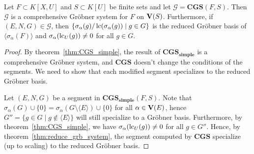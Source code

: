 \begin{theorem}\label{thm:CGS}
  Let $F \subset K[X, U]$ and $S \subset K[U]$ be finite sets and let $\mathcal G = \mathbf{CGS}(F, S)$. Then $\mathcal G$ is a comprehensive Gröbner system for $F$ on $\operatorname{\mathbf V}(S)$. Furthermore, if $(E, N, G) \in \mathcal G$, then $\{\sigma_{\alpha}(g)/\operatorname{lc}(\sigma_{\alpha}(g)) \mid g \in G\}$ is the reduced Gröbner basis of $\langle \sigma_{\alpha}(F) \rangle$ and $\sigma_{\alpha}(\operatorname{lc}_{U}(g)) \neq 0$ for all $g \in G$.
\end{theorem}
\begin{proof}
  By theorem~\ref{thm:CGS_simple}, the result of $\mathbf{CGS_{simple}}$ is a comprehensive Gröbner system, and $\mathbf{CGS}$ doesn't change the conditions of the segments. We need to show that each modified segment specializes to the reduced Gröbner basis.

  Let $(E, N, G)$ be a segment in $\mathbf{CGS_{simple}}(F, S)$. Note that $\sigma_{\alpha}(G) \cup \{0\} = \sigma_{\alpha}(G \setminus \langle E \rangle) \cup \{0\}$ for all $\alpha \in \operatorname{\mathbf V}(E)$, hence $G'' = \{g \in G \mid g \notin \langle E \rangle\}$ will still specialize to a Gröbner basis. Furthermore, by theorem~\ref{thm:CGS_simple}, we have $\sigma_{\alpha}(\operatorname{lc}_{U}(g)) \neq 0$ for all $g \in G''$. Hence, by theorem~\ref{thm:reduce_grb_system}, the segment computed by $\mathbf{CGS}$ specialize (up to scaling) to the reduced Gröbner basis.
\end{proof}




